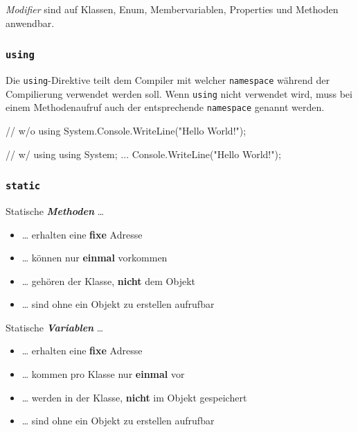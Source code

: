 \documentclass[
  9pt,
  a4paperpaper,
  DIV=11]{scrartcl}
\newenvironment{Shaded}{}{}
\newcommand{\CommentTok}[1]{\textcolor[rgb]{0.42,0.45,0.49}{#1}}
\newcommand{\FunctionTok}[1]{\textcolor[rgb]{0.44,0.26,0.76}{#1}}
\newcommand{\KeywordTok}[1]{\textcolor[rgb]{0.84,0.23,0.29}{#1}}
\newcommand{\NormalTok}[1]{\textcolor[rgb]{0.14,0.16,0.18}{#1}}
\newcommand{\OperatorTok}[1]{\textcolor[rgb]{0.14,0.16,0.18}{#1}}
\newcommand{\StringTok}[1]{\textcolor[rgb]{0.01,0.18,0.38}{#1}}
\providecommand{\tightlist}{%
  \setlength{\itemsep}{0pt}\setlength{\parskip}{0pt}}\usepackage{longtable,booktabs,array}
\numberwithin{equation}{section}
\begin{document}
\begin{multicols}{2}
\begin{tcolorbox}
\begin{tcolorbox}
\begin{tcolorbox}
\emph{Modifier} sind auf Klassen, Enum, Membervariablen, Properties und
Methoden anwendbar.

\hypertarget{using}{%
\subsubsection{\texorpdfstring{\texttt{using}}{using}}\label{using}}

Die \texttt{using}-Direktive teilt dem Compiler mit welcher
\texttt{namespace} während der Compilierung verwendet werden soll. Wenn
\texttt{using} nicht verwendet wird, muss bei einem Methodenaufruf auch
der entsprechende \texttt{namespace} genannt werden.

\begin{Shaded}
\begin{Highlighting}[]
\CommentTok{// w/o \textasciigrave{}using\textasciigrave{}}
\NormalTok{System}\OperatorTok{.}\FunctionTok{Console}\OperatorTok{.}\FunctionTok{WriteLine}\OperatorTok{(}\StringTok{"Hello World!"}\OperatorTok{);}

\CommentTok{// w/ \textasciigrave{}using\textasciigrave{}}
\KeywordTok{using}\NormalTok{ System}\OperatorTok{;}
\OperatorTok{...}
\NormalTok{Console}\OperatorTok{.}\FunctionTok{WriteLine}\OperatorTok{(}\StringTok{"Hello World!"}\OperatorTok{);}
\end{Highlighting}
\end{Shaded}

\hypertarget{static}{%
\subsubsection{\texorpdfstring{\texttt{static}}{static}}\label{static}}

Statische \textbf{\emph{Methoden}} \ldots{}

\begin{itemize}
\tightlist
\item
  \ldots{} erhalten eine \textbf{fixe} Adresse
\item
  \ldots{} können nur \textbf{einmal} vorkommen
\item
  \ldots{} gehören der Klasse, \textbf{nicht} dem Objekt
\item
  \ldots{} sind ohne ein Objekt zu erstellen aufrufbar
\end{itemize}

Statische \textbf{\emph{Variablen}} \ldots{}

\begin{itemize}
\tightlist
\item
  \ldots{} erhalten eine \textbf{fixe} Adresse
\item
  \ldots{} kommen pro Klasse nur \textbf{einmal} vor
\item
  \ldots{} werden in der Klasse, \textbf{nicht} im Objekt gespeichert
\item
  \ldots{} sind ohne ein Objekt zu erstellen aufrufbar
\end{itemize}


\end{tcolorbox}
\end{tcolorbox}
\end{tcolorbox}
\end{multicols}
\end{document}
